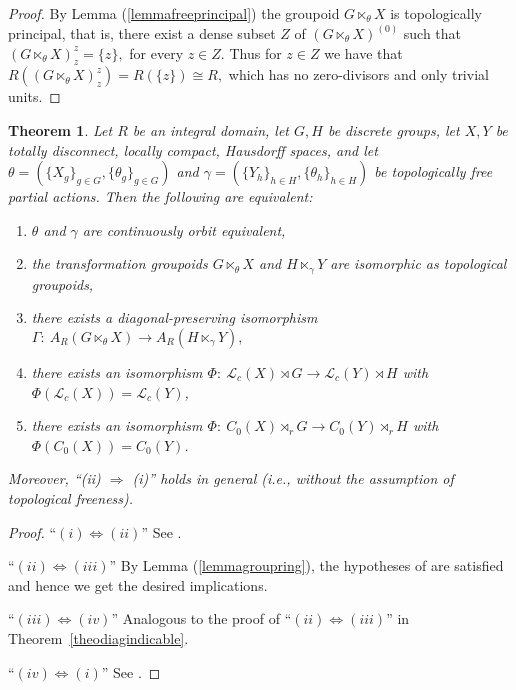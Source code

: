 \documentclass[11pt, a4paper]{amsart}
\newcommand{\Gx}{\ensuremath {G \ltimes_\theta X}}
\newcommand{\Lc}{\ensuremath {\mathcal{L}_c(X)}}
\newcommand{\an}[1]{``#1''} %
\theoremstyle{plain}
\newtheorem{theorem}{Theorem}[section]
\begin{document}
\begin{proof}
By Lemma (\ref{lemmafreeprincipal}) the groupoid $\Gx$ is topologically principal, that is, there exist a dense subset $Z$ of $(\Gx)^{(0)}$ such that $(\Gx)_{z}^{z}= \{z\},$ for every $z \in Z.$ Thus for $z \in Z$ we have that  $R((\Gx)_{z}^{z})=R(\{z\}) \cong R,$ which has no zero-divisors and only trivial units.
\end{proof}


\begin{theorem}
Let $R$ be an integral domain, let $G, H$ be discrete groups, let $X, Y$ be totally disconnect, locally compact, Hausdorff spaces, and let $\theta=(\{X_g\}_{g \in G}, \{\theta_g\}_{g \in G})$ and $\gamma=(\{Y_h\}_{h \in H}, \{\theta_h\}_{h \in H})$ be topologically free partial actions. Then the following are equivalent:
\begin{enumerate}[{\rm (i)}]
\item $\theta$ and $\gamma$ are continuously orbit equivalent,
\item the transformation groupoids $\Gx$ and $H \ltimes_{\gamma} Y$ are isomorphic as topological groupoids,
\item there exists a diagonal-preserving isomorphism $\Gamma: \ A_R(\Gx) \longrightarrow  A_R(H \ltimes_\gamma Y),$ 
\item there exists an isomorphism $\Phi: \ \mathcal{L}_c(X)\rtimes G \longrightarrow \mathcal{L}_c(Y)\rtimes H$ with $\Phi(\Lc) = \mathcal{L}_c(Y)$,
\item there exists an isomorphism $\Phi: \: C_0(X) \rtimes_r G \longrightarrow C_0(Y) \rtimes_r H$ with $\Phi(C_0(X)) = C_0(Y)$.
\end{enumerate}
Moreover, \an{(ii) $\Rightarrow$ (i)} holds in general (i.e., without the assumption of topological freeness).
\end{theorem}

\begin{proof} 
\an{$(i) \Leftrightarrow (ii)$} See \cite[Theorem 2.7]{Xin}.

\an{$(ii) \Leftrightarrow (iii)$} By Lemma (\ref{lemmagroupring}), the hypotheses of \cite[Corollary~3.2.]{James} are satisfied and hence we get the desired implications.

\an{$(iii) \Leftrightarrow (iv)$} Analogous to the proof of \an{$(ii) \Leftrightarrow (iii)$} in Theorem~\ref{theodiagindicable}.

\an{$(iv) \Leftrightarrow (i)$}  See \cite[Theorem 2.7]{Xin}.
\end{proof}
\end{document}
